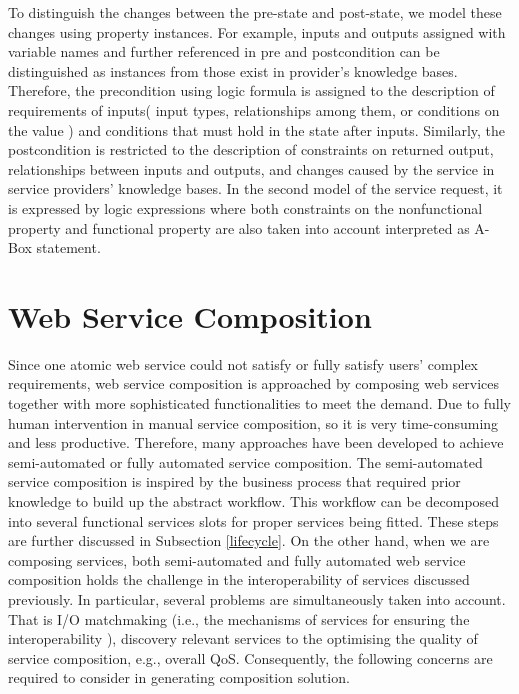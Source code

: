 To distinguish the changes between the pre-state and post-state, we model these changes using property instances. For example, inputs and outputs assigned with variable names and further referenced in pre and postcondition can be distinguished as instances from those exist in provider's knowledge bases. Therefore, the precondition using logic formula is assigned to the description of requirements of inputs( input types, relationships among them, or conditions on the value ) and conditions that must hold in the state after inputs. Similarly, the postcondition is restricted to the description of constraints on returned output, relationships between inputs and outputs, and changes caused by the service in service providers' knowledge bases. In the second model of the service request, it is expressed by logic expressions where both constraints on the nonfunctional property and functional property are also taken into account interpreted as A-Box statement.





\section{Web Service Composition}\label{overview}

Since one atomic web service could not satisfy or fully satisfy users' complex requirements, web service composition is approached by composing web services together with more sophisticated functionalities to meet the demand. Due to fully human intervention in manual service composition, so it is very time-consuming and less productive. Therefore, many approaches have been developed to achieve semi-automated or fully automated service composition. The semi-automated service composition is inspired by the business process that required prior knowledge to build up the abstract workflow. This workflow can be decomposed into several functional services slots for proper services being fitted. These steps are further discussed in Subsection \ref{lifecycle}. On the other hand, when we are composing services, both semi-automated and fully automated web service composition holds the challenge in the interoperability of services discussed previously. In particular, several problems are simultaneously taken into account. That is I/O matchmaking (i.e., the mechanisms of services for ensuring the interoperability ), discovery relevant services to the optimising the quality of service composition, e.g., overall QoS. Consequently, the following concerns are required to consider in generating composition solution. 


